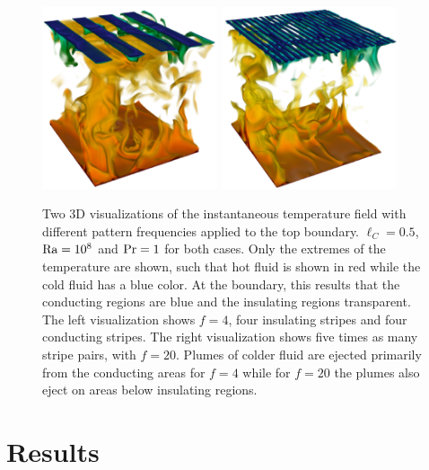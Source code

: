 \begin{figure}
\centering
\includegraphics[width=0.46\textwidth]{fig2a.pdf}
\qquad
\includegraphics[width=0.46\textwidth]{fig2b.pdf}
\caption{%
Two 3D visualizations of the instantaneous temperature field with
different pattern frequencies applied to the top boundary.  $\ell_C=0.5$,
$\text{Ra}=10^8$ and $\text{Pr}=1$ for both cases.
Only the extremes of the temperature are shown, such that
hot fluid is shown in red while
the cold fluid has a blue color. At the boundary, this results that the
conducting regions are blue and the insulating regions transparent.
The left visualization shows $f=4$, four
insulating stripes and four conducting stripes. The right visualization
shows five times as many stripe pairs, with $f=20$.  Plumes of colder
fluid are ejected primarily from the conducting areas for $f=4$ while for
$f=20$ the plumes also eject on areas below insulating regions.  }
\label{figure2}
\end{figure}%

\newpage
\section{Results}\label{VariationPattern}%
